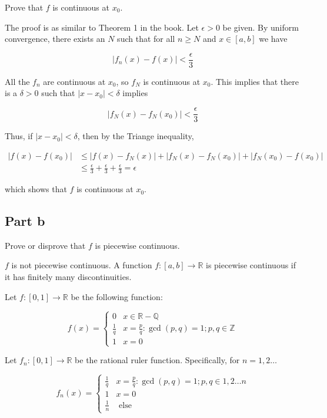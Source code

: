 \documentclass{article}
\newcommand{\R}{\mathbb{R}}
\newcommand{\Q}{\mathbb{Q}}
\newcommand{\Z}{\mathbb{Z}}
\begin{document}
Prove that $f$ is continuous at $x_0$.

The proof is as similar to Theorem 1 in the book. Let $\epsilon > 0$ be given. By uniform convergence, there exists an $N$ such that for all $n \geq N$ and $x \in [a, b]$ we have

\[
|f_n(x) - f(x)| < \frac{\epsilon}{3}
\]

All the $f_n$ are continuous at $x_0$, so $f_N$ is continuous at $x_0$. This implies that there is a $\delta > 0$ such that $|x-x_0| < \delta$ implies

\[
|f_N(x) - f_N(x_0)| < \frac{\epsilon}{3}
\]

Thus, if $|x - x_0| < \delta$, then by the Triange inequality,

\begin{align*}
|f(x) - f(x_0)| &\leq |f(x) - f_N(x)| + |f_N(x) - f_N(x_0)| + |f_N(x_0) - f(x_0)| \\
&\leq \frac{\epsilon}{3} + \frac{\epsilon}{3} +\frac{\epsilon}{3} = \epsilon
\end{align*}

which shows that $f$ is continuous at $x_0$.

\subsection*{Part b}

Prove or disprove that $f$ is piecewise continuous.

$f$ is not piecewise continuous. A function $f: [a, b] \rightarrow \R$ is piecewise continuous if it has finitely many discontinuities.

Let $f: [0, 1] \rightarrow \R$ be the following function:

\[
f(x) = 
\begin{cases}
0 & x \in \R - \Q \\
\frac{1}{q} & x = \frac{p}{q}: \gcd(p, q) = 1; p, q \in \Z \\
1 & x = 0
\end{cases}
\]

Let $f_n: [0, 1] \rightarrow \R$ be the rational ruler function. Specifically,  for $n = 1, 2 \dots$

\[
f_n(x) = 
\begin{cases}
\frac{1}{q} & x = \frac{p}{q}: \gcd(p, q) = 1; p, q \in 1, 2 \dots n \\
1 & x = 0 \\
\frac{1}{n} & \text{ else}
\end{cases}
\]
\end{document}
